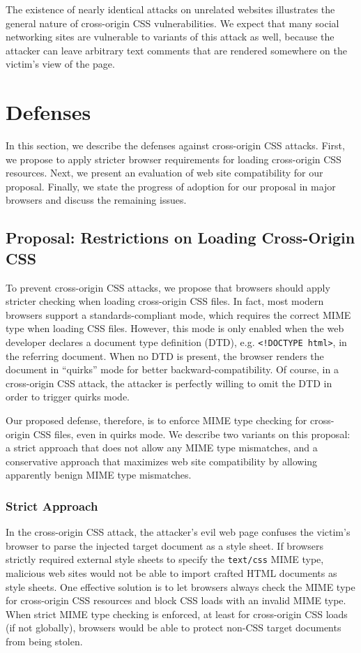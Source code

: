 \documentclass{acm_proc_article-sp}
\begin{document}
The existence of nearly identical attacks on unrelated websites
illustrates the general nature of cross-origin CSS vulnerabilities. We
expect that many social networking sites are vulnerable to variants of
this attack as well, because the attacker can leave arbitrary text
comments that are rendered somewhere on the victim's view of the page.

\section{Defenses} \label{sec:defenses}
In this section, we describe the defenses against cross-origin CSS attacks.
First, we propose to apply stricter browser requirements for loading
cross-origin CSS resources. Next, we present an evaluation of web site
compatibility for our proposal. Finally, we state the progress of adoption for
our proposal in major browsers and discuss the remaining issues.

\subsection{Proposal: Restrictions on Loading Cross-Origin CSS} \label{sec:proposal}
To prevent cross-origin
CSS attacks, we propose that browsers should apply stricter checking when
loading cross-origin CSS files. In fact, most modern browsers support a
standards-compliant mode, which requires the correct MIME type when loading CSS
files. However, this mode is only enabled when the web developer declares a
document type definition (DTD), e.g. \verb|<!DOCTYPE html>|, in the referring
document. When no DTD is present, the browser renders the document in
``quirks'' mode for better backward-compatibility. Of course, in a
cross-origin CSS attack, the attacker is perfectly willing to omit the DTD in
order to trigger quirks mode.

Our proposed defense, therefore, is to enforce MIME type checking for
cross-origin CSS files, even in quirks mode. We describe two variants on this
proposal: a strict approach that does not allow any MIME type mismatches, and
a conservative approach that maximizes web site compatibility by allowing
apparently benign MIME type mismatches.

\subsubsection{Strict Approach}
In the cross-origin CSS attack, the attacker's evil web page confuses the victim's browser to parse the injected target document as a style sheet. If browsers strictly required external style sheets to specify the \texttt{text/css} MIME type, malicious web sites would not be able to import crafted HTML documents as style sheets. One effective solution is to let browsers always check the MIME type for cross-origin CSS resources and block CSS loads with an invalid MIME type. When strict MIME type checking is enforced, at least for cross-origin CSS loads (if not globally), browsers would be able to protect non-CSS target documents from being stolen.
\end{document}
